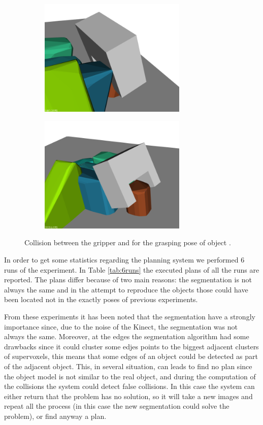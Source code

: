 \begin{figure}
\centering
\begin{subfigure}[t]{0.45\textwidth}
\centering
\includegraphics[width = 7cm]{Img/experiments/exp_good/grasp_o2.png}
\caption{}
\end{subfigure}
\begin{subfigure}[t]{0.45\textwidth}
\centering
\includegraphics[width = 7cm]{Img/experiments/exp_good/grasp_o2_2.png}
\caption{}
\end{subfigure}
\caption{Collision between the gripper and  for the grasping pose of object .}\label{fig:exp_good_grasp_o2}
\end{figure}

In order to get some statistics regarding the planning system we performed 6 runs of the experiment. In Table \ref{tab:6runs} the executed plans of all the runs are reported. The plans differ because of two main reasons: the segmentation is not always the same and in the attempt to reproduce the objects those could have been located not in the exactly poses of previous experiments. 

From these experiments it has been noted that the segmentation have a strongly importance since, due to the noise of the Kinect, the segmentation was not always the same. Moreover, at the edges the segmentation algorithm had some drawbacks since it could cluster some edjes points to the biggest adjacent clusters of supervoxels, this means that some edges of an object could be detected as part of the adjacent object. This, in several situation, can leads to find no plan since the object model is not similar to the real object, and during the computation of the collisions the system could detect false collisions. In this case the system can either return that the problem has no solution, so it will take a new images and repeat all the process (in this case the new segmentation could solve the problem), or find anyway a plan.  




